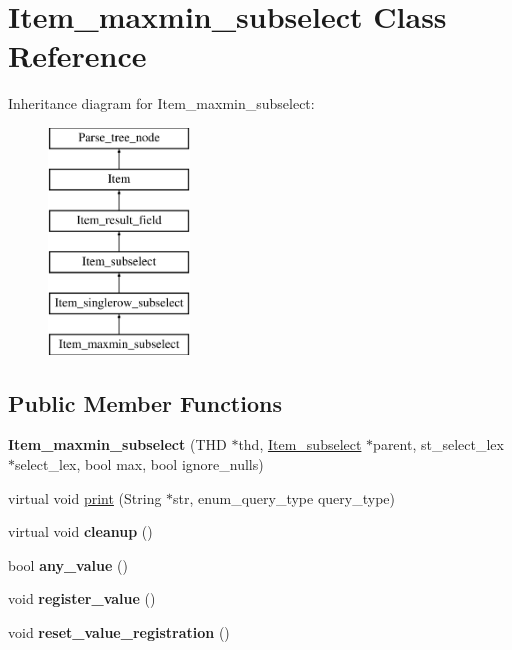 \hypertarget{classItem__maxmin__subselect}{}\section{Item\+\_\+maxmin\+\_\+subselect Class Reference}
\label{classItem__maxmin__subselect}
Inheritance diagram for Item\+\_\+maxmin\+\_\+subselect\+:\begin{figure}[H]
\begin{center}
\leavevmode
\includegraphics[height=6.000000cm]{classItem__maxmin__subselect}
\end{center}
\end{figure}
\subsection*{Public Member Functions}
\begin{DoxyCompactItemize}
\item 
\mbox{\label{classItem__maxmin__subselect_a0d74e27d8a2a08d3ad80c87267aba43c}} 
{\bfseries Item\+\_\+maxmin\+\_\+subselect} (T\+HD $\ast$thd, \mbox{\hyperlink{classItem__subselect}{Item\+\_\+subselect}} $\ast$parent, st\+\_\+select\+\_\+lex $\ast$select\+\_\+lex, bool max, bool ignore\+\_\+nulls)
\item 
virtual void \mbox{\hyperlink{classItem__maxmin__subselect_ad03a1c165ac9ec019b5c7e80f108cddd}{print}} (String $\ast$str, enum\+\_\+query\+\_\+type query\+\_\+type)
\item 
\mbox{\label{classItem__maxmin__subselect_ac372a6ca5365e2c85a89915a9fe570c4}} 
virtual void {\bfseries cleanup} ()
\item 
\mbox{\label{classItem__maxmin__subselect_a5abc0232a881ddfcb644cd0ebf835a07}} 
bool {\bfseries any\+\_\+value} ()
\item 
\mbox{\label{classItem__maxmin__subselect_ab3e584694b7363b4583941f30163bf99}} 
void {\bfseries register\+\_\+value} ()
\item 
\mbox{\label{classItem__maxmin__subselect_a258f261b239b3cc1c90a3df3ce509e07}} 
void {\bfseries reset\+\_\+value\+\_\+registration} ()
\end{DoxyCompactItemize}
